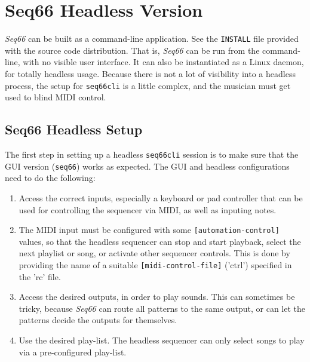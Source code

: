 %
%
%

\section{Seq66 Headless Version}
\label{sec:headless}

   \textsl{Seq66} can be built as a command-line application.
   See the \texttt{INSTALL} file provided with the source code distribution.
   That is, \textsl{Seq66}
   can be run from the command-line, with no visible user interface.
   It can also be instantiated as a Linux daemon, for totally headless usage.
   Because there is not a lot of visibility into a headless process, the
   setup for \texttt{seq66cli} is a little complex, and the musician must get
   used to blind MIDI control.

\subsection{Seq66 Headless Setup}
\label{subsec:headless_setup}

   The first step in setting up a headless \texttt{seq66cli} session is
   to make sure that the GUI version (\texttt{seq66}) works as expected.
   The GUI and headless configurations need to do the following:
   
   \begin{enumerate}
      \item Access the correct inputs, especially a keyboard or pad controller
         that can be used for controlling the sequencer via MIDI, as well as
         inputing notes.
      \item The MIDI input must be configured with some
         \texttt{[automation-control]}
         values, so that the headless sequencer can stop and
         start playback, select the next playlist or song, or activate other
         sequencer controls.  This is done by providing the name of a 
         suitable
         \texttt{[midi-control-file]} ('ctrl') specified in the 'rc' file.
      \item Access the desired outputs, in order to play sounds.  This can
         sometimes be tricky, because \textsl{Seq66} can route all
         patterns to the same output, or can let the patterns decide the
         outputs for themselves.
      \item Use the desired play-list.  The headless sequencer can only select
         songs to play via a pre-configured play-list.
   \end{enumerate}


